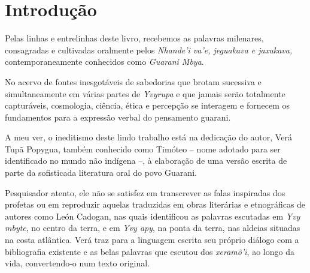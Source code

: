 \chapter{Introdução}

Pelas linhas e entrelinhas deste livro, recebemos as palavras milenares,
consagradas e cultivadas oralmente pelos \emph{Nhande’i va’e, jeguakava e jaxukava,}
contemporaneamente conhecidos como \emph{Guarani Mbya}.

No acervo de fontes
inesgotáveis de sabedorias que brotam sucessiva e simultaneamente em várias
partes de \emph{Yvyrupa} e que jamais serão totalmente capturáveis, cosmologia,
ciência, ética e percepção se interagem e fornecem os fundamentos para a
expressão verbal do pensamento guarani.

A meu ver, o ineditismo deste lindo
trabalho está na dedicação do autor, Verá Tupã Popygua, também conhecido como
Timóteo – nome adotado para ser identificado no mundo não indígena –, à
elaboração de uma versão escrita de parte da sofisticada literatura oral do
povo Guarani.

Pesquisador atento, ele não se satisfez em transcrever as falas
inspiradas dos profetas ou em reproduzir aquelas traduzidas em obras literárias
e etnográficas de autores como León Cadogan, nas quais identificou as palavras
escutadas em \emph{Yvy mbyte}, no centro da terra, e em \emph{Yvy apy}, na ponta da terra,
nas aldeias situadas na costa atlântica. Verá traz para a linguagem escrita seu
próprio diálogo com a bibliografia existente e as belas palavras que escutou
dos \emph{xeramõ’i}, ao longo da vida, convertendo-o num texto original.

